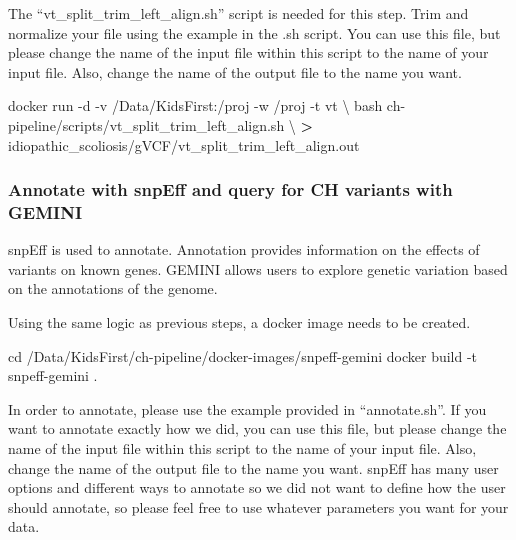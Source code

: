 \documentclass[]{article}
\newenvironment{Shaded}{\begin{snugshade}}{\end{snugshade}}
\newcommand{\BuiltInTok}[1]{#1}
\newcommand{\ExtensionTok}[1]{#1}
\newcommand{\NormalTok}[1]{#1}
\newcommand{\OperatorTok}[1]{\textcolor[rgb]{0.81,0.36,0.00}{\textbf{#1}}}
\begin{document}
The ``vt\_split\_trim\_left\_align.sh'' script is needed for this step.
Trim and normalize your file using the example in the .sh script. You
can use this file, but please change the name of the input file within
this script to the name of your input file. Also, change the name of the
output file to the name you want.

\begin{Shaded}
\begin{Highlighting}[]
\ExtensionTok{docker}\NormalTok{ run -d -v /Data/KidsFirst:/proj -w /proj -t vt \textbackslash{}}
\NormalTok{  bash ch-pipeline/scripts/vt_split_trim_left_align.sh \textbackslash{}}
  \OperatorTok{>}\NormalTok{ idiopathic_scoliosis/gVCF/vt_split_trim_left_align.out}
\end{Highlighting}
\end{Shaded}

\hypertarget{annotate-with-snpeff-and-query-for-ch-variants-with-gemini}{%
\subsubsection{Annotate with snpEff and query for CH variants with
GEMINI}\label{annotate-with-snpeff-and-query-for-ch-variants-with-gemini}}

snpEff is used to annotate. Annotation provides information on the
effects of variants on known genes. GEMINI allows users to explore
genetic variation based on the annotations of the genome.

Using the same logic as previous steps, a docker image needs to be
created.

\begin{Shaded}
\begin{Highlighting}[]
\BuiltInTok{cd}\NormalTok{ /Data/KidsFirst/ch-pipeline/docker-images/snpeff-gemini}
\ExtensionTok{docker}\NormalTok{ build -t snpeff-gemini .}
\end{Highlighting}
\end{Shaded}

In order to annotate, please use the example provided in
``annotate.sh''. If you want to annotate exactly how we did, you can use
this file, but please change the name of the input file within this
script to the name of your input file. Also, change the name of the
output file to the name you want. snpEff has many user options and
different ways to annotate so we did not want to define how the user
should annotate, so please feel free to use whatever parameters you want
for your data.
\end{document}
